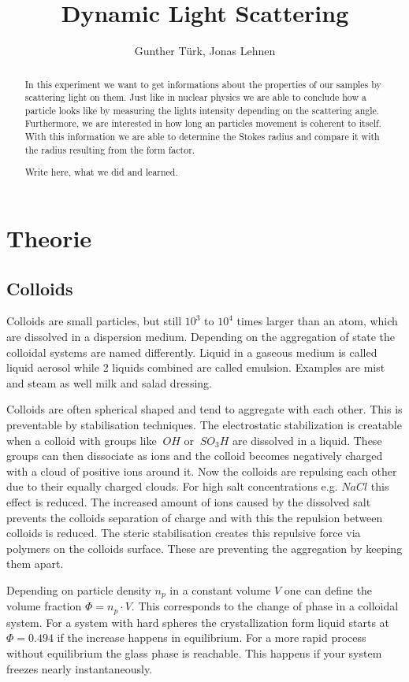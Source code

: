 \documentclass[]{article}
\title{Dynamic Light Scattering}
\author{Gunther T\"urk, Jonas Lehnen}
\begin{document}
\maketitle
\tableofcontents
\begin{abstract}
In this experiment we want to get informations about the properties of our samples by scattering light on them. Just like in nuclear physics we are able to conclude how a particle looks like by measuring the lights intensity depending on the scattering angle. Furthermore, we are interested in how long an particles movement is coherent to itself. With this information we are able to determine the Stokes radius and compare it with the radius resulting from the form factor.


Write here, what we did and learned.
\end{abstract}


\section{Theorie}
\subsection{Colloids}
Colloids are small particles, but still $10^3$ to $10^4$ times larger than an atom, which are dissolved in a dispersion medium. Depending on the aggregation of state the colloidal systems are named differently. Liquid in a gaseous medium is called liquid aerosol while 2 liquids combined are called emulsion. Examples are mist and steam as well milk and salad dressing.

Colloids are often spherical shaped and tend to aggregate with each other. This is preventable by stabilisation techniques. The electrostatic stabilization is creatable when a colloid with groups like $~OH$ or $~SO_3H$ are dissolved in a liquid. These groups  can then dissociate as ions and the colloid becomes negatively charged with a cloud of positive ions around it. Now the colloids are repulsing each other due to their equally charged clouds. For high salt concentrations e.g. $NaCl$ this effect is reduced. The increased amount of ions caused by the dissolved salt prevents the colloids separation of charge and with this the repulsion between colloids is reduced. 
The steric stabilisation creates this repulsive force via polymers on the colloids surface. These are preventing the aggregation by keeping them apart.

Depending on particle density $n_p$ in a constant volume $V$ one can define the volume fraction $\Phi = n_p \cdot V$. This corresponds to the change of phase in a colloidal system. For a system with hard spheres the crystallization form liquid starts at $\Phi=0.494$ if the increase happens in equilibrium. For a more rapid process without equilibrium the glass phase is reachable. This happens if your system freezes nearly instantaneously.  
\end{document}
